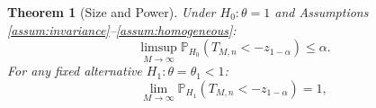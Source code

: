 \documentclass{article}
\theoremstyle{plain}
\newtheorem{theorem}{Theorem}
\theoremstyle{definition}
\theoremstyle{remark}
\begin{document}
\begin{theorem}[Size and Power]
\label{thm:test_homo}
Under $H_0: \theta = 1$ and Assumptions \ref{assum:invariance}--\ref{assum:homogeneous}:
\begin{equation*}
    \limsup_{M \to \infty} \mathbb P_{H_0}(T_{M,n} < -z_{1-\alpha}) \leq \alpha.
\end{equation*}
For any fixed alternative $H_1: \theta = \theta_1 < 1$:
\begin{equation*}
    \lim_{M \to \infty} \mathbb P_{H_1}(T_{M,n} < -z_{1-\alpha}) = 1,
\end{equation*}
\end{theorem}






\end{document}
